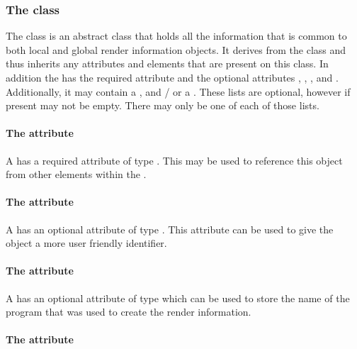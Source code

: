 \subsubsection{The  class}
\label{renderinformationbase-class}

The \RenderInformationBase class is an abstract class that holds all the 
information that is common to both local and global render 
information objects. It  derives from the \SBase class and thus
inherits any attributes and elements that are present on this class. In 
addition the \RenderInformationBase has the required attribute  and the 
optional attributes , , , 
 and . Additionally, it may
contain a \ListOfColorDefinitions, \ListOfGradientDefinitions and / or a \ListOfLineEndings. 
These lists are optional, however if present may not be empty. There may only be one 
of each of those lists. 

\paragraph{The \fixttspace{} attribute}

A \RenderInformationBase has a required attribute  of type
. This  may be used to reference this \RenderInformation 
object from other elements within the \RenderPackage.

\paragraph{The \fixttspace{} attribute}

A \RenderInformationBase has an optional attribute  of type
. This  attribute can be used to give the object a 
more user friendly identifier.

\paragraph{The \fixttspace{} attribute}

A \RenderInformationBase has an optional attribute 
of type  which can be used to store the name of the program 
that was used to create the render information.

\paragraph{The \fixttspace{} attribute}

